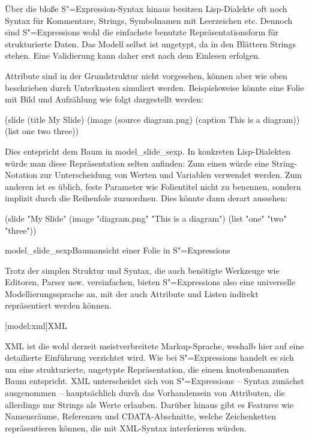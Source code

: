 \documentclass[11pt, a4paper, bibgerm]{scrbook}
\newenvironment{DIFnomarkup}{}{}
\newcommand\lsection{}
\newcommand\abb{}
\newcommand\fig{}
\newcommand{\sexp}{S"=Expression}
\newcommand{\sexps}{S"=Expressions}
\begin{document}
Über die bloße \sexp{}-Syntax hinaus besitzen Lisp-Dialekte oft noch
Syntax für Kommentare, Strings, Symbolnamen mit Leerzeichen
etc. Dennoch sind \sexps{} wohl die einfachste benutzte
Repräsentationsform für strukturierte Daten. Das Modell selbst ist
ungetypt, da in den Blättern Strings stehen. Eine Validierung kann
daher erst nach dem Einlesen erfolgen.

Attribute sind in der Grundstruktur nicht vorgesehen, können aber wie
oben beschrieben durch Unterknoten simuliert werden. Beispielsweise
könnte eine Folie mit Bild und Aufzählung wie folgt dargestellt werden:
\begin{DIFnomarkup}\begin{code}
(slide 
  (title My Slide)
  (image
    (source diagram.png)
    (caption This is a diagram))
  (list one two three))
\end{code}\end{DIFnomarkup}
Dies entspricht dem Baum in \abb{model_slide_sexp}. In konkreten
Lisp-Dialekten würde man diese Repräsentation selten anfinden: Zum einen
würde eine String-Notation zur Unterscheidung von Werten und Variablen
verwendet werden. Zum anderen ist es üblich, feste Parameter wie
Folientitel nicht zu benennen, sondern implizit durch die Reihenfole
zuzuordnen. Dies könnte dann derart aussehen:
\begin{DIFnomarkup}\begin{code}
(slide "My Slide"
  (image "diagram.png" "This is a diagram")
  (list "one" "two" "three"))
\end{code}\end{DIFnomarkup}

\fig{model_slide_sexp}{Baumansicht einer Folie in \sexps{}}

Trotz der simplen Struktur und Syntax, die auch benötigte Werkzeuge wie
Editoren, Parser usw. vereinfachen, bieten \sexps{} also eine
universelle Modellierungssprache an, mit der auch Attribute und Listen
indirekt repräsentiert werden können.

\lsection[model:xml]{XML}

XML ist die wohl derzeit meistverbreitete Markup-Sprache, weshalb hier
auf eine detailierte Einführung verzichtet wird. Wie bei \sexps{}
handelt es sich um eine strukturierte, ungetypte Repräsentation, die
einem knotenbenannten Baum entspricht. XML unterscheidet sich von
\sexps{} -- Syntax zunächst ausgenommen -- hauptsächlich durch das
Vorhandensein von Attributen, die allerdings nur Strings als Werte
erlauben. Darüber hinaus gibt es Features wie Namensräume, Referenzen
und CDATA-Abschnitte, welche Zeichenketten repräsentieren können, die
mit XML-Syntax interferieren würden.
\end{document}
